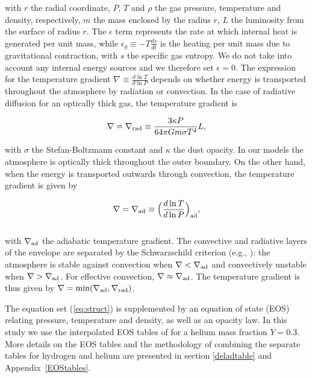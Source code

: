 \documentclass[apj]{emulateapj}
\newcommand{\delad}{\nabla_{\rm ad}}
\newcommand{\delrad}{\nabla_{\rm rad}}
\newcommand{\App}[1]{Appendix~\ref{#1}}
\begin{document}
\noindent with $r$ the radial coordinate, $P$, $T$ and $\rho$ the gas pressure, temperature and density, respectively, $m$ the mass enclosed by the radius $r$, $L$ the luminosity from the surface of radius $r$. The $\epsilon$ term represents the rate at which internal heat is generated per unit mass, while $\epsilon_g \equiv -T \frac{ds}{dt}$ is the heating per unit mass due to gravitational contraction, with $s$ the specific gas entropy. We do not take into account any internal energy sources and we therefore set $\epsilon=0$. The expression for the temperature gradient $\nabla \equiv \frac{d \ln T}{d \ln P}$ depends on whether energy is transported throughout the atmosphere by radiation or convection. In the case of radiative diffusion for an optically thick gas, the temperature gradient is

\begin{equation}
\label{eq:delrad}
\nabla = \delrad \equiv \frac{3 \kappa P}{64 \pi G m \sigma T^4} L,
\end{equation}

\noindent with $\sigma$ the Stefan-Boltzmann constant and $\kappa$ the dust opacity. In our models the atmosphere is optically thick throughout the outer boundary. On the other hand, when the energy is transported outwards through convection, the temperature gradient is given by

\begin{equation}
\label{eq:delad}
\nabla = \delad \equiv \Big(\frac{d \ln T}{d \ln P}\Big)_{\mathrm{ad}},
\end{equation}
\\

\noindent with $\delad$ the adiabatic temperature gradient. The convective and radiative layers of the envelope are separated by the Schwarzschild criterion (e.g., \citealt{thompson06}): the atmosphere is stable against convection when $\nabla < \delad$ and convectively unstable when $\nabla > \delad$. For effective convection, $\nabla \approx \delad$.  The temperature gradient is thus given by $\nabla=\mathrm{min}(\delad, \delrad)$. 

The equation set (\ref{eq:struct}) is supplemented by an equation of state (EOS) relating pressure, temperature and density, as well as an opacity law. In this study we use the interpolated EOS tables of \citet{saumon95} for a helium mass fraction $Y=0.3$. More details on the EOS tables and the methodology of combining the separate tables for hydrogen and helium are presented in section \ref{deladtable} and \App{EOStables}.
\end{document}
